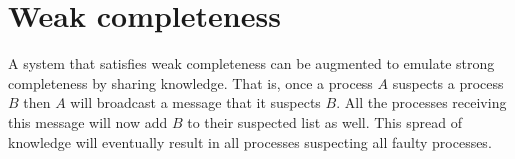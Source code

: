 \documentclass[11pt]{amsart}
\begin{document}
\section{Weak completeness}

A system that satisfies weak completeness can be augmented to emulate strong
completeness by sharing knowledge. That is, once a process $A$ suspects a
process $B$ then $A$ will broadcast a message that it suspects $B$. All the
processes receiving this message will now add $B$ to their suspected list as
well. This spread of knowledge will eventually result in all processes
suspecting all faulty processes.
\end{document}
